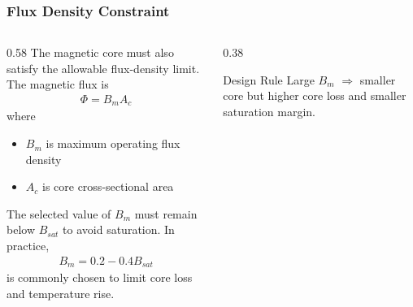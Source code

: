 \begin{frame} \frametitle{Flux Density Constraint} 
    \begin{columns} 
        \begin{column}{0.58\textwidth} 
            The magnetic core must also satisfy the allowable flux-density limit. \vspace{0.15cm} The magnetic flux is 
            \begin{align} 
                \Phi = B_m A_c 
            \end{align} 
            where 
            \begin{itemize} 
                \item $B_m$ is maximum operating flux density 
                \item $A_c$ is core cross-sectional area \end{itemize} \vspace{0.15cm} The selected value of $B_m$ must remain below $B_{sat}$ to avoid saturation. In practice, 
                    \begin{align} 
                        B_m = 0.2-0.4B_{sat} 
                    \end{align} is commonly chosen to limit core loss and temperature rise. 
                \end{column} 
        \begin{column}{0.38\textwidth} 
                    \begin{block}{Design Rule} Large $B_m$ \vspace{0.05cm} $\Rightarrow$ smaller core \vspace{0.15cm} but \vspace{0.15cm} higher core loss \vspace{0.15cm} and smaller saturation margin. 
                    \end{block} 
        \end{column} 
    \end{columns} 
\end{frame} %
